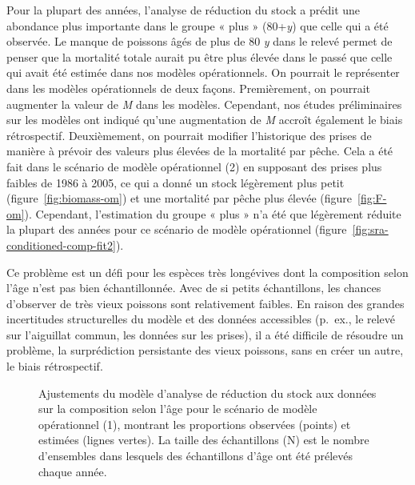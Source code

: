 \documentclass[11pt]{book}
\begin{document}
Pour la plupart des années, l'analyse de réduction du stock a prédit une abondance plus importante dans le groupe « plus » (80+\emph{y}) que celle qui a été observée. Le manque de poissons âgés de plus de 80 \emph{y} dans le relevé permet de penser que la mortalité totale aurait pu être plus élevée dans le passé que celle qui avait été estimée dans nos modèles opérationnels. On pourrait le représenter dans les modèles opérationnels de deux façons. Premièrement, on pourrait augmenter la valeur de \emph{M} dans les modèles. Cependant, nos études préliminaires sur les modèles ont indiqué qu'une augmentation de \emph{M} accroît également le biais rétrospectif. Deuxièmement, on pourrait modifier l'historique des prises de manière à prévoir des valeurs plus élevées de la mortalité par pêche. Cela a été fait dans le scénario de modèle opérationnel (2) en supposant des prises plus faibles de 1986 à 2005, ce qui a donné un stock légèrement plus petit (figure~\ref{fig:biomass-om}) et une mortalité par pêche plus élevée (figure~\ref{fig:F-om}). Cependant, l'estimation du groupe « plus » n'a été que légèrement réduite la plupart des années pour ce scénario de modèle opérationnel (figure~\ref{fig:sra-conditioned-comp-fit2}).

Ce problème est un défi pour les espèces très longévives dont la composition selon l'âge n'est pas bien échantillonnée. Avec de si petits échantillons, les chances d'observer de très vieux poissons sont relativement faibles. En raison des grandes incertitudes structurelles du modèle et des données accessibles (p.~ex., le relevé sur l'aiguillat commun, les données sur les prises), il a été difficile de résoudre un problème, la surprédiction persistante des vieux poissons, sans en créer un autre, le biais rétrospectif.

\clearpage


\begin{figure}[htb]

{\centering {} 

}

\caption{Ajustements du modèle d'analyse de réduction du stock aux données sur la composition selon l'âge pour le scénario de modèle opérationnel (1), montrant les proportions observées (points) et estimées (lignes vertes). La taille des échantillons (N) est le nombre d'ensembles dans lesquels des échantillons d'âge ont été prélevés chaque année.}\label{fig:sra-conditioned-comp-fit1}
\end{figure}
\clearpage
\end{document}
